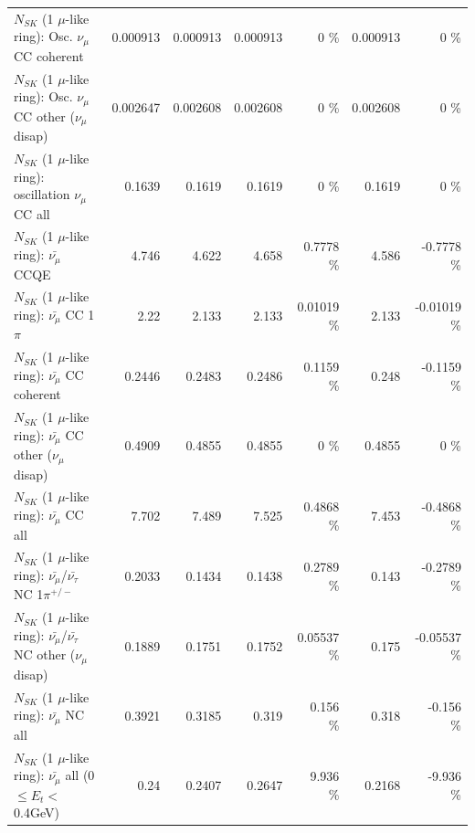 \begin{table}
\begin{tabular}{| l | r | r | r  r | r  r |}
                        $N_{SK}$ (1 $\mu$-like ring): Osc. $\nu_\mu$ CC coherent &        0.000913 &        0.000913 &        0.000913 &        0 \%  &        0.000913 &        0 \%  \\ 
         $N_{SK}$ (1 $\mu$-like ring): Osc. $\nu_\mu$ CC other ($\nu_\mu$ disap) &        0.002647 &        0.002608 &        0.002608 &        0 \%  &        0.002608 &        0 \%  \\ 
                      $N_{SK}$ (1 $\mu$-like ring): oscillation $\nu_\mu$ CC all &          0.1639 &          0.1619 &          0.1619 &        0 \%  &          0.1619 &        0 \%  \\ 
\hline
\hline
                              $N_{SK}$ (1 $\mu$-like ring): $\bar{\nu_\mu}$ CCQE &           4.746 &           4.622 &           4.658 &   0.7778 \%  &           4.586 &  -0.7778 \%  \\ 
                         $N_{SK}$ (1 $\mu$-like ring): $\bar{\nu_\mu}$ CC 1$\pi$ &            2.22 &           2.133 &           2.133 &  0.01019 \%  &           2.133 & -0.01019 \%  \\ 
                       $N_{SK}$ (1 $\mu$-like ring): $\bar{\nu_\mu}$ CC coherent &          0.2446 &          0.2483 &          0.2486 &   0.1159 \%  &           0.248 &  -0.1159 \%  \\ 
        $N_{SK}$ (1 $\mu$-like ring): $\bar{\nu_\mu}$ CC other ($\nu_\mu$ disap) &          0.4909 &          0.4855 &          0.4855 &        0 \%  &          0.4855 &        0 \%  \\ 
                          $N_{SK}$ (1 $\mu$-like ring): $\bar{\nu_{\mu}}$ CC all &           7.702 &           7.489 &           7.525 &   0.4868 \%  &           7.453 &  -0.4868 \%  \\ 
\hline
  $N_{SK}$ (1 $\mu$-like ring): $\bar{\nu_\mu}$/$\bar{\nu_\tau}$ NC 1$\pi^{+/-}$ &          0.2033 &          0.1434 &          0.1438 &   0.2789 \%  &           0.143 &  -0.2789 \%  \\ 
$N_{SK}$ (1 $\mu$-like ring): $\bar{\nu_\mu}$/$\bar{\nu_\tau}$ NC other ($\nu_\mu$ disap) &          0.1889 &          0.1751 &          0.1752 &  0.05537 \%  &           0.175 & -0.05537 \%  \\ 
                          $N_{SK}$ (1 $\mu$-like ring): $\bar{\nu_{\mu}}$ NC all &          0.3921 &          0.3185 &           0.319 &    0.156 \%  &           0.318 &   -0.156 \%  \\ 
\hline
   $N_{SK}$ (1 $\mu$-like ring): $\bar{\nu_{\mu}}$ all (0 $\leq E_{t} <$ 0.4GeV) &            0.24 &          0.2407 &          0.2647 &    9.936 \%  &          0.2168 &   -9.936 \%  \\ 

\end{tabular}
\end{table}
